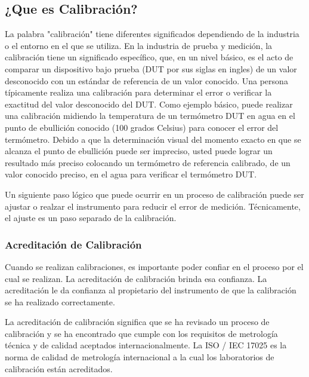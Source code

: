\subsection{¿Que es Calibración?}

\par 
La palabra "calibración" tiene diferentes significados dependiendo de la industria o el entorno en el que se utiliza. En la industria de prueba y medición, la calibración tiene un significado específico, que, en un nivel básico, es el acto de comparar un dispositivo bajo prueba (DUT por sus siglas en ingles) de un valor desconocido con un estándar de referencia de un valor conocido. Una persona típicamente realiza una calibración para determinar el error o verificar la exactitud del valor desconocido del DUT. Como ejemplo básico, puede realizar una calibración midiendo la temperatura de un termómetro DUT en agua en el punto de ebullición conocido (100 grados Celsius) para conocer el error del termómetro. Debido a que la determinación visual del momento exacto en que se alcanza el punto de ebullición puede ser impreciso, usted puede lograr un resultado más preciso colocando un termómetro de referencia calibrado, de un valor conocido preciso, en el agua para verificar el termómetro DUT\cite{calibracion-fluke}.

\par \noindent
Un siguiente paso lógico que puede ocurrir en un proceso de calibración puede ser ajustar o realzar el instrumento para reducir el error de medición. Técnicamente, el ajuste es un paso separado de la calibración\cite{calibracion-fluke}.

\subsubsection{Acreditación de Calibración \cite{calibracion-fluke}}

\par 
Cuando se realizan calibraciones, es importante poder confiar en el proceso por el cual se realizan. La acreditación de calibración brinda esa confianza. La acreditación le da confianza al propietario del instrumento de que la calibración se ha realizado correctamente.

\par \noindent
La acreditación de calibración significa que se ha revisado un proceso de calibración y se ha encontrado que cumple con los requisitos de metrología técnica y de calidad aceptados internacionalmente. La ISO / IEC 17025 es la norma de calidad de metrología internacional a la cual los laboratorios de calibración están acreditados.

